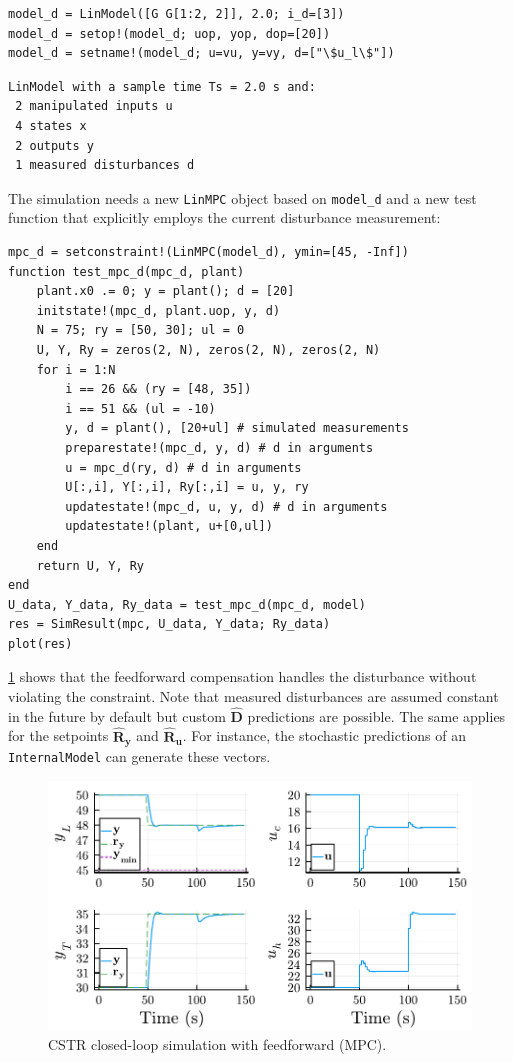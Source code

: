 \begin{verbatim}
model_d = LinModel([G G[1:2, 2]], 2.0; i_d=[3])
model_d = setop!(model_d; uop, yop, dop=[20])
model_d = setname!(model_d; u=vu, y=vy, d=["\$u_l\$"])
\end{verbatim}
\spacerepl
\begin{verbatim}
LinModel with a sample time Ts = 2.0 s and:
 2 manipulated inputs u
 4 states x
 2 outputs y
 1 measured disturbances d
\end{verbatim}
The simulation needs a new \texttt{LinMPC} object based on \texttt{model\_d} and a new test function that explicitly employs the current disturbance measurement:
\begin{verbatim}
mpc_d = setconstraint!(LinMPC(model_d), ymin=[45, -Inf])
function test_mpc_d(mpc_d, plant)
    plant.x0 .= 0; y = plant(); d = [20]
    initstate!(mpc_d, plant.uop, y, d)
    N = 75; ry = [50, 30]; ul = 0
    U, Y, Ry = zeros(2, N), zeros(2, N), zeros(2, N)
    for i = 1:N
        i == 26 && (ry = [48, 35])
        i == 51 && (ul = -10)
        y, d = plant(), [20+ul] # simulated measurements
        preparestate!(mpc_d, y, d) # d in arguments
        u = mpc_d(ry, d) # d in arguments
        U[:,i], Y[:,i], Ry[:,i] = u, y, ry
        updatestate!(mpc_d, u, y, d) # d in arguments
        updatestate!(plant, u+[0,ul])
    end
    return U, Y, Ry
end
U_data, Y_data, Ry_data = test_mpc_d(mpc_d, model)
res = SimResult(mpc, U_data, Y_data; Ry_data)
plot(res)
\end{verbatim}
\cref{fig:plot_LinMPC2} shows that the feedforward compensation handles the disturbance without violating the constraint. Note that measured disturbances are assumed constant in the future by default but custom $\mathbf{\hat{D}}$ predictions are possible. The same applies for the setpoints $\mathbf{\hat{R}_y}$ and $\mathbf{\hat{R}_u}$. For instance, the stochastic predictions of an \texttt{InternalModel} can generate these vectors.

\begin{figure}[ht]
    \centering
    \includegraphics[width=\columnwidth]{fig/plot_LinMPC2.pdf}
    \caption{CSTR closed-loop simulation with feedforward (MPC).}\label{fig:plot_LinMPC2}
\end{figure}

